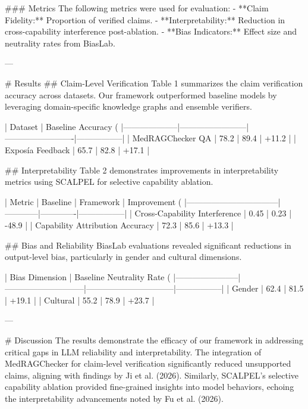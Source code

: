 ### Metrics  
The following metrics were used for evaluation:  
- **Claim Fidelity:** Proportion of verified claims.  
- **Interpretability:** Reduction in cross-capability interference post-ablation.  
- **Bias Indicators:** Effect size and neutrality rates from BiasLab.  

---

# Results  
## Claim-Level Verification  
Table 1 summarizes the claim verification accuracy across datasets. Our framework outperformed baseline models by leveraging domain-specific knowledge graphs and ensemble verifiers.

| Dataset           | Baseline Accuracy (%
|--------------------|------------------------|-------------------------|-----------------|
| MedRAGChecker QA  | 78.2                  | 89.4                   | +11.2           |
| Exposía Feedback  | 65.7                  | 82.8                   | +17.1           |

## Interpretability  
Table 2 demonstrates improvements in interpretability metrics using SCALPEL for selective capability ablation.

| Metric                          | Baseline   | Framework   | Improvement (%
|---------------------------------|------------|-------------|-----------------|
| Cross-Capability Interference   | 0.45       | 0.23        | -48.9           |
| Capability Attribution Accuracy | 72.3       | 85.6        | +13.3           |

## Bias and Reliability  
BiasLab evaluations revealed significant reductions in output-level bias, particularly in gender and cultural dimensions.

| Bias Dimension       | Baseline Neutrality Rate (%
|-----------------------|-----------------------------|--------------------------------|-----------------|
| Gender               | 62.4                        | 81.5                           | +19.1           |
| Cultural             | 55.2                        | 78.9                           | +23.7           |

---

# Discussion  
The results demonstrate the efficacy of our framework in addressing critical gaps in LLM reliability and interpretability. The integration of MedRAGChecker for claim-level verification significantly reduced unsupported claims, aligning with findings by Ji et al. (2026). Similarly, SCALPEL's selective capability ablation provided fine-grained insights into model behaviors, echoing the interpretability advancements noted by Fu et al. (2026).

